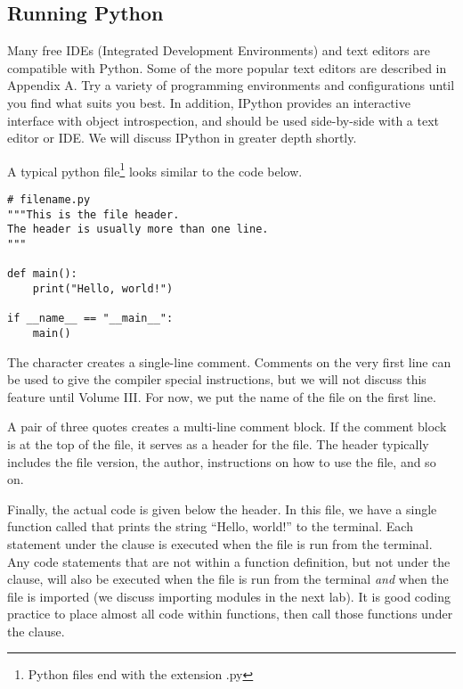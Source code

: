 \subsection*{Running Python}

Many free IDEs (Integrated Development Environments) and text editors are compatible with Python.
Some of the more popular text editors are described in Appendix A.
Try a variety of programming environments and configurations until you find what suits you best.
In addition, IPython provides an interactive interface with object introspection, and should be used side-by-side with a text editor or IDE.
We will discuss IPython in greater depth shortly.

A typical python file\footnote{Python files end with the extension .py} looks similar to the code below.

\begin{lstlisting}
# filename.py
"""This is the file header.
The header is usually more than one line.
"""

def main():
    print("Hello, world!")

if __name__ == "__main__":
    main()
\end{lstlisting}

The \li{#} character creates a single-line comment.
Comments on the very first line can be used to give the compiler special instructions, but we will not discuss this feature until Volume III.
For now, we put the name of the file on the first line. 

A pair of three quotes creates a multi-line comment block.
If the comment block is at the top of the file, it serves as a header for the file.
The header typically includes the file version, the author, instructions on how to use the file, and so on.

Finally, the actual code is given below the header.
In this file, we have a single function called  that prints the string ``Hello, world!'' to the terminal.
Each statement under the  clause is executed when the file is run from the terminal.
Any code statements that are not within a function definition, but not under the  clause, will also be executed when the file is run from the terminal \emph{and} when the file is imported (we discuss importing modules in the next lab).
It is good coding practice to place almost all code within functions, then call those functions under the  clause.


